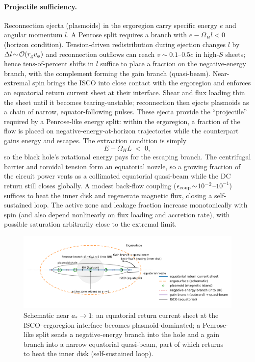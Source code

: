 \documentclass[twocolumn]{aastex701}
\begin{document}
\paragraph{Projectile sufficiency.}
Reconnection ejecta (plasmoids) in the ergoregion carry specific energy $e$ and angular momentum $l$. A Penrose split requires a branch with $e-\Omega_H l<0$ (horizon condition). Tension-driven redistribution during ejection changes $l$ by $\Delta l\!\sim\!\mathcal{O}(r_{\rm g}v_\phi)$ and reconnection outflows can reach $v\!\sim\!0.1$–$0.5c$ in high-$S$ sheets; hence tens-of-percent shifts in $l$ suffice to place a fraction on the negative-energy branch, with the complement forming the gain branch (quasi-beam).
Near-extremal spin brings the ISCO into close contact with the ergoregion and enforces an equatorial return current sheet at their interface. Shear and flux loading thin the sheet until it becomes tearing-unstable; reconnection then ejects plasmoids as a chain of narrow, equator-following pulses. These ejecta provide the “projectile” required by a Penrose-like energy split: within the ergoregion, a fraction of the flow is placed on negative-energy-at-horizon trajectories while the counterpart gains energy and escapes. The extraction condition is simply
\begin{equation}
E - \Omega_H L \;<\; 0,
\end{equation}
so the black hole’s rotational energy pays for the escaping branch. The centrifugal barrier and toroidal tension form an equatorial nozzle, so a growing fraction of the circuit power vents as a collimated equatorial quasi-beam while the DC return still closes globally. A modest back-flow coupling ($\epsilon_{\rm coup}\!\sim\!10^{-2}$–$10^{-1}$) suffices to heat the inner disk and regenerate magnetic flux, closing a self-sustained loop. The active zone and leakage fraction increase monotonically with spin (and also depend nonlinearly on flux loading and accretion rate), with possible saturation arbitrarily close to the extremal limit.
\begin{figure}[t!]
  \centering
  \includegraphics[width=\textwidth]{fig_equatorial_trigger_schematic.pdf}
  \caption{Schematic near $a_*\!\to\!1$: an equatorial return current sheet at the ISCO–ergoregion interface becomes plasmoid-dominated; a Penrose-like split sends a negative-energy branch into the hole and a gain branch into a narrow equatorial quasi-beam, part of which returns to heat the inner disk (self-sustained loop).}
  \label{fig:equatorial_trigger}
\end{figure}
\end{document}
